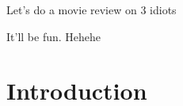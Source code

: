 \documentclass{article}
\begin{document}
Let's do a movie review on 3 idiots



It'll be fun.
Hehehe


\section{Introduction}
\end{document}
